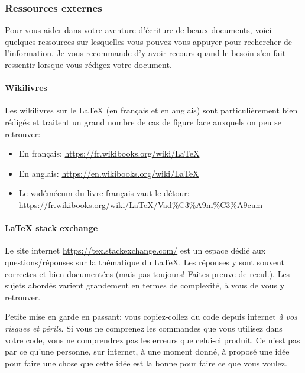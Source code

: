        \subsubsection{Ressources externes}\label{sssect:ressources_externes}
            Pour vous aider dans votre aventure d'écriture de beaux documents, voici quelques ressources sur lesquelles vous pouvez vous appuyer pour rechercher de l'information.
            Je vous recommande d'y avoir recours quand le besoin s'en fait ressentir lorsque vous rédigez votre document.
            
            \paragraph{Wikilivres}
                Les wikilivres sur le \LaTeX{} (en français et en anglais) sont particulièrement bien rédigés et traitent un grand nombre de cas de figure face auxquels on peu se retrouver:
                \begin{itemize}
                \item En français: \url{https://fr.wikibooks.org/wiki/LaTeX}
                \item En anglais: \url{https://en.wikibooks.org/wiki/LaTeX}
                \item Le vadémécum du livre français vaut le détour: \url{https://fr.wikibooks.org/wiki/LaTeX/Vad%C3%A9m%C3%A9cum}
                \end{itemize}
            
            \paragraph{\LaTeX{} stack exchange}
                Le site internet \url{https://tex.stackexchange.com/} est un espace dédié aux questions/réponses sur la thématique du \LaTeX{}.
                Les réponses y sont souvent correctes et bien documentées (mais pas toujours! Faites preuve de recul.).
                Les sujets abordés varient grandement en termes de complexité, à vous de vous y retrouver.
                
                Petite mise en garde en passant: vous copiez-collez du code depuis internet \emph{à vos risques et périls}.
                Si vous ne comprenez les commandes que vous utilisez dans votre code, vous ne comprendrez pas les erreurs que celui-ci produit.
                Ce n'est pas par ce qu'une personne, sur internet, à une moment donné, à proposé une idée pour faire une chose que cette idée est la bonne pour faire ce que vous voulez.
            
